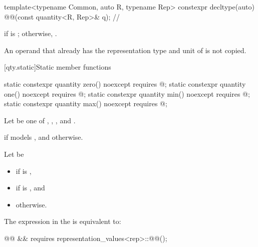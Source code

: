 \begin{itemdecl}
template<typename Common, auto R, typename Rep>
  constexpr decltype(auto) @@(const quantity<R, Rep>& q);         // \expos
\end{itemdecl}

\begin{itemdescr}
\pnum
\returns
{} if
is ;
otherwise, .
\begin{note}
An operand that already has the representation type and unit of 
is not copied.
\end{note}
\end{itemdescr}

[qty.static]{Static member functions}

\begin{itemdecl}
static constexpr quantity zero() noexcept
  requires @\seebelownc@;
static constexpr quantity one() noexcept
  requires @\seebelownc@;
static constexpr quantity min() noexcept
  requires @\seebelownc@;
static constexpr quantity max() noexcept
  requires @\seebelownc@;
\end{itemdecl}

\begin{itemdescr}
\pnum
Let  be one of , , , and .

\pnum
\returns
{}
if  models , and
 otherwise.

\pnum
\remarks
Let  be
\begin{itemize}
\item
{}
if  is ,
\item
{}
if  is , and
\item
{} otherwise.
\end{itemize}
The expression in the  is equivalent to:
\begin{codeblock}
@@ && requires { representation_values<rep>::@@(); }
\end{codeblock}
\end{itemdescr}

